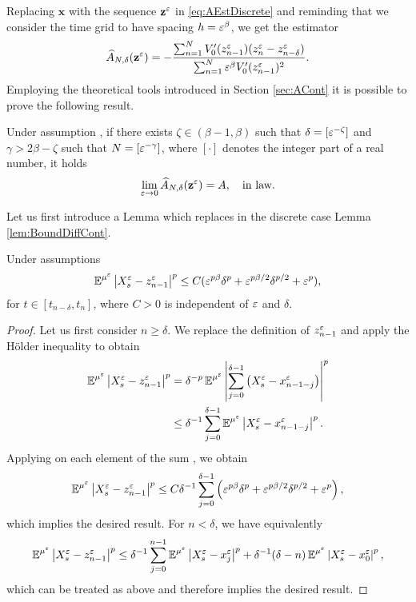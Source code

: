 \documentclass[10pt]{article}
\begin{document}
Replacing $\mathbf x$ with the sequence $\mathbf z^\varepsilon$ in \eqref{eq:AEstDiscrete} and reminding that we consider the time grid to have spacing $h = \varepsilon^\beta$, we get the estimator 
\begin{equation}\label{eq:AEstDiscreteZ}
	\widehat A_{N, \delta}(\mathbf z^\varepsilon) = -\frac{\sum_{n=1}^{N}V_0'(z^\varepsilon_{n-1})(z^\varepsilon_n - z^\varepsilon_{n-\delta})}{\sum_{n=1}^{N} \varepsilon^\beta V_0'(z^\varepsilon_{n-1})^2}.
\end{equation}
Employing the theoretical tools introduced in Section \ref{sec:ACont} it is possible to prove the following result.
\begin{theorem}\label{thm:DriftDiscrete} Under assumption , if there exists $\zeta \in (\beta - 1, \beta)$ such that $\delta = [\varepsilon^{-\zeta}]$ and $\gamma > 2\beta - \zeta$ such that $N = [\varepsilon^{-\gamma}]$, where $[\cdot]$ denotes the integer part of a real number, it holds 
	\begin{equation}
	\lim_{\varepsilon\to 0} \widehat A_{N, \delta}(\mathbf z^\varepsilon) = A, \quad \text{in law}.
	\end{equation}
\end{theorem}

Let us first introduce a Lemma which replaces in the discrete case Lemma \ref{lem:BoundDiffCont}.
\begin{lemma}\label{lem:BoundDiff} Under assumptions 
	\begin{equation}
		\operatorname{\mathbb{E}}^{\mu^\varepsilon}\left\lvert X_s^\varepsilon - z^\varepsilon_{n-1}\right\rvert^p \leq C(\varepsilon^{p\beta}\delta^p + \varepsilon^{p\beta/2}\delta^{p/2} + \varepsilon^p),
	\end{equation}
	for $t \in [t_{n-\delta}, t_n]$, where $C > 0$ is independent of $\varepsilon$ and $\delta$.
\end{lemma}
\begin{proof} Let us first consider $n \geq \delta$. We replace the definition of $z^\varepsilon_{n-1}$ and apply the Hölder inequality to obtain
	\begin{equation}
	\begin{aligned}
		\operatorname{\mathbb{E}}^{\mu^\varepsilon}\left\lvert X_s^\varepsilon - z^\varepsilon_{n-1}\right\rvert^p &= \delta^{-p} \operatorname{\mathbb{E}}^{\mu^\varepsilon} \left\lvert\sum_{j=0}^{\delta-1}\left(X_s^\varepsilon - x^\varepsilon_{n-1-j}\right)\right\rvert^p \\
		&\leq \delta^{-1}\sum_{j=0}^{\delta-1} \operatorname{\mathbb{E}}^{\mu^\varepsilon}\left\lvert X_s^\varepsilon - x^\varepsilon_{n-1-j}\right\rvert^p.
	\end{aligned}
	\end{equation}
	Applying on each element of the sum \cite[Lemma 6.1]{PaS07}, we obtain
	\begin{equation}
		\operatorname{\mathbb{E}}^{\mu^\varepsilon}\left\lvert X_s^\varepsilon - z^\varepsilon_{n-1}\right\rvert^p \leq C \delta^{-1} \sum_{j=0}^{\delta-1} \left(\varepsilon^{p\beta}\delta^p + \varepsilon^{p\beta/2}\delta^{p/2} + \varepsilon^p\right),
	\end{equation}
	which implies the desired result. For $n < \delta$, we have equivalently
	\begin{equation}
		\operatorname{\mathbb{E}}^{\mu^\varepsilon}\left\lvert X_s^\varepsilon - z^\varepsilon_{n-1}\right\rvert^p \leq \delta^{-1}\sum_{j=0}^{n-1}\operatorname{\mathbb{E}}^{\mu^\varepsilon}\left\lvert X_s^\varepsilon - x^\varepsilon_j\right\rvert^p + \delta^{-1}(\delta - n)\operatorname{\mathbb{E}}^{\mu^\varepsilon}\left\lvert X_s^\varepsilon - x^\varepsilon_0\right\rvert^p,
	\end{equation}
	which can be treated as above and therefore implies the desired result.
\end{proof}
\end{document}
